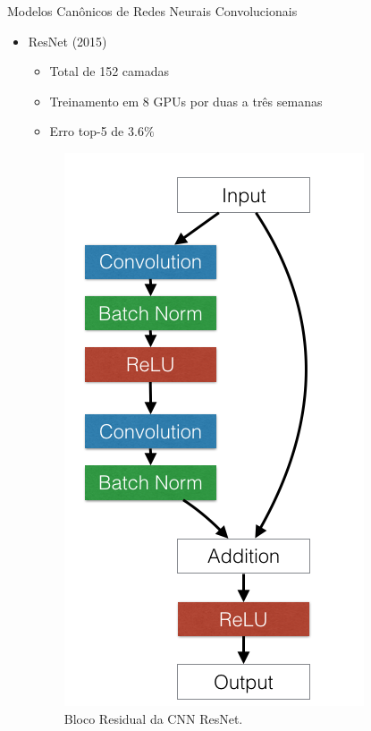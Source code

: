 \begin{frame}{Modelos Canônicos de Redes Neurais Convolucionais}
   \ \  \\[0.1cm]
   \begin{itemize}
     \item ResNet (2015)
     \begin{itemize}
       \item Total de 152 camadas
       \item Treinamento em 8 GPUs por duas a três semanas
       \item Erro top-5 de $3.6\%$
     \end{itemize}
     \begin{figure}[h!]
     \centering
     \caption{Bloco Residual da CNN ResNet.}\label{fig:bloco_residual}
     \includegraphics[height=0.3\textheight]{img/resnets_modelvariants}
     \end{figure}
   \end{itemize}
\end{frame}


